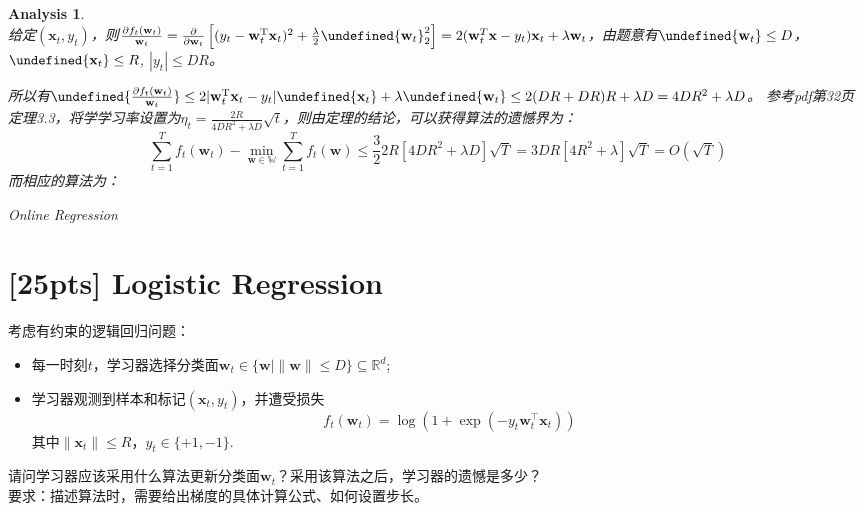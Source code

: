 \documentclass[a4paper,UTF8]{article}
\let\norm\undefined %
\DeclarePairedDelimiter\norm{\lVert}{\rVert}
\numberwithin{equation}{section}
\newtheorem*{myAnalysis}{Analysis}
\begin{document}
\begin{myAnalysis}~\\
给定$(\mathbf{x}_t, y_t)$，则$\frac{\partial f_t(\mathbf{w}_t)}{\mathbf{w}_t} = \frac{\partial}{\partial \mathbf{w}_t}\left[ (y_t - \mathbf{w}_t^\mathrm{T} \mathbf{x}_t)^2 + \frac{\lambda}{2} \norm{\mathbf{w}_t}_2^2 \right] = 2(\mathbf{w}_t^T \mathbf{x} - y_t) \mathbf{x}_t + \lambda \mathbf{w}_t$，由题意有$\norm{\mathbf{w}_t} \le D$，$\norm{\mathbf{x}_t} \le R$, $|y_t| \le DR$。

所以有$\norm{\frac{\partial f_t(\mathbf{w}_t)}{\mathbf{w}_t}} \le 2|\mathbf{w}_t^\mathrm{T} \mathbf{x}_t - y_t| \norm{\mathbf{x}_t} + \lambda \norm{\mathbf{w}_t} \le 2(DR + DR) R + \lambda D = 4DR^2 + \lambda D$。
参考pdf第32页定理3.3，将学学习率设置为$\eta_t = \frac{2R}{4DR^2 + \lambda D} \sqrt{t}$，则由定理的结论，可以获得算法的遗憾界为：
\[
\sum_{t=1}^T f_t(\mathbf{w}_t) - \min_{\mathbf{w} \in \mathbb{W}} \sum_{t=1}^T f_t(\mathbf{w}) \le \frac{3}{2} 2R [4DR^2 + \lambda D] \sqrt{T} = 3DR[4R^2 + \lambda] \sqrt{T} = O(\sqrt{T})
\]
而相应的算法为：
\begin{algorithm}  
	\caption{Online Regression}  
	\begin{algorithmic}[1] %
		  \State{ $\mathbf{w}_{t+1} = \frac{D}{\max\{ D, \norm{\mathbf{w}_{t+1}'} \} } \mathbf{w}_{t+1}' $ }
		\EndFor  
	\end{algorithmic} 
\end{algorithm}  
\end{myAnalysis}

\newpage
\section{[25pts] Logistic Regression}
\noindent [在线分类] 考虑有约束的逻辑回归问题：
\begin{itemize}
  \item 每一时刻$t$，学习器选择分类面$\mathbf{w}_t \in \{\mathbf{w}| \|\mathbf{w}\| \leq D\} \subseteq \mathbb{R}^d$;
  \item 学习器观测到样本和标记$(\mathbf{x}_t,y_t)$，并遭受损失
  \[
  f_t(\mathbf{w}_t)=\log\left( 1+ \exp(-y_t \mathbf{w}_t^\top \mathbf{x}_t)\right)
  \]
其中$\|\mathbf{x}_t\| \leq R$，$y_t \in \{+1,-1\}$.
\end{itemize}
请问学习器应该采用什么算法更新分类面$\mathbf{w}_t$？采用该算法之后，学习器的遗憾是多少？\\
要求：描述算法时，需要给出梯度的具体计算公式、如何设置步长。
\end{document}

